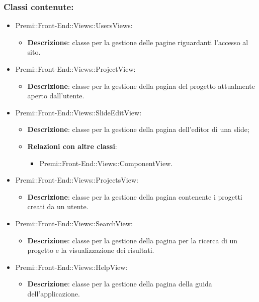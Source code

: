 	\subsubsection*{Classi contenute:}
	\begin{itemize}

		\item Premi::Front-End::Views::UsersViews:
		\begin{itemize}
			\item \textbf{Descrizione}: classe per la gestione delle pagine riguardanti l'accesso al sito.
		\end{itemize}

		\item Premi::Front-End::Views::ProjectView:
		\begin{itemize}
			\item \textbf{Descrizione}: classe per la gestione della pagina del progetto attualmente aperto dall'utente.
		\end{itemize}

		\item Premi::Front-End::Views::SlideEditView:
		\begin{itemize}
			\item \textbf{Descrizione}: classe per la gestione della pagina dell'editor di una \gls{slide};
			\item \textbf{Relazioni con altre classi}:
			\begin{itemize}
				\item Premi::Front-End::Views::ComponentView.
			\end{itemize}
		\end{itemize}

		\item Premi::Front-End::Views::ProjectsView:
		\begin{itemize}
			\item \textbf{Descrizione}: classe per la gestione della pagina contenente i progetti creati da un utente.
		\end{itemize}

		\item Premi::Front-End::Views::SearchView:
		\begin{itemize}
			\item \textbf{Descrizione}: classe per la gestione della pagina per la ricerca di un progetto e la visualizzazione dei risultati.
		\end{itemize}

		\item Premi::Front-End::Views::HelpView:
		\begin{itemize}
			\item \textbf{Descrizione}: classe per la gestione della pagina della guida dell'applicazione.
		\end{itemize}


\end{itemize}

